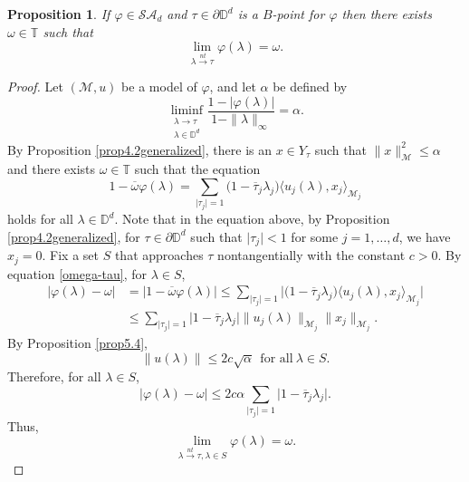 \documentclass[11pt, reqno]{amsart}
\newtheorem{proposition}[theorem]{Proposition}
\newcommand\1{\boldsymbol {1}}
\numberwithin{equation}{section}
\begin{document}
\begin{proposition}\label{phi-nt-omega}
    If $\varphi\in\mathcal{SA}_{d}$ and $\tau\in\partial\mathbb{D}^{d}$ is a $B$-point for $\varphi$ then there exists $\omega\in\mathbb{T}$ such that 
 $$ \lim_{\lambda{\overset{nt}\rightarrow} \tau} \varphi(\lambda)= \omega.$$  
\end{proposition}
\begin{proof}
Let $(\mathcal{M},u)$ be a model of $\varphi$, and let $\alpha$ be defined by 
    $$\liminf_{\substack{\lambda\rightarrow \tau \\ \lambda\in\mathbb{D}^{d}}} \dfrac{1-\lvert \varphi(\lambda) \rvert}{1-\|\lambda\|_{\infty}}=\alpha.$$
By Proposition \ref{prop4.2generalized}, there is an $x\in Y_{\tau}$ such that $\|x\|_{\mathcal{M}}^{2}\leq \alpha$ and
there exists $\omega\in\mathbb{T}$ such that the equation
\begin{equation}\label{omega-tau}
1-\overline{\omega}\varphi(\lambda)=\sum_{\lvert \tau_{j} \rvert = 1}\Big(1-\overline{\tau}_{j}\lambda_{j}\Big)\langle u_{j}(\lambda),x_{j}\rangle_{\mathcal{M}_{j}}
\end{equation}
holds for all $\lambda\in\mathbb{D}^{d}$.  Note that in the equation above, by Proposition \ref{prop4.2generalized}, for $\tau\in\partial\mathbb{D}^{d}$ such that $\lvert \tau_{j}\rvert<1$ for some $j=1,\hdots,d$, we have $x_{j}=0$.
Fix a set $S$ that approaches $\tau$ nontangentially with the constant $c>0$. By equation \eqref{omega-tau},
for $\lambda\in S$, 
\begin{align}
|\varphi(\lambda) - \omega|& =| 1-\overline{\omega}\varphi(\lambda)| \leq \sum_{\lvert \tau_{j} \rvert = 1}
\lvert \Big(1-\overline{\tau}_{j}\lambda_{j}\Big)\langle u_{j}(\lambda),x_{j}\rangle_{\mathcal{M}_{j}}\rvert\\
  &\leq \sum_{\lvert \tau_{j} \rvert = 1} \lvert 1-\overline{\tau}_{j}\lambda_{j} \rvert \|u_{j}(\lambda)\|_{\mathcal{M}_{j}}
 \|x_{j}\|_{\mathcal{M}_{j}}.
\end{align}
By Proposition \ref{prop5.4},
$$\|u(\lambda)\|\leq 2c\sqrt{\alpha}~~\text{for all}~\lambda\in S.$$
Therefore, for all $\lambda\in S$,
\begin{equation}
|\varphi(\lambda) - \omega| \leq 2c \alpha \sum_{\lvert \tau_{j} \rvert = 1} \lvert 1-\overline{\tau}_{j}\lambda_{j} \rvert.
\end{equation}
Thus, 
$$ \lim_{\lambda{\overset{nt}\rightarrow\tau, \lambda \in S} } \varphi(\lambda)= \omega.$$  
\end{proof}
\end{document}
